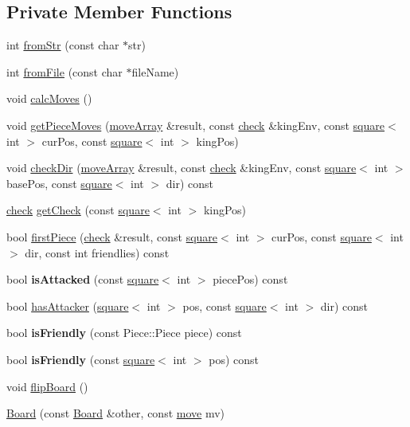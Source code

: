 \subsection*{Private Member Functions}
\begin{DoxyCompactItemize}
\item 
int \hyperlink{classBoard_a49045c77d568e4b5a00f176a2add54c8}{from\+Str} (const char $\ast$str)
\item 
int \hyperlink{classBoard_a4043087fc35e9706d0e83ec07225fe33}{from\+File} (const char $\ast$file\+Name)
\item 
void \hyperlink{classBoard_ad4d3ebb2342b74d9455a89924a54aa14}{calc\+Moves} ()
\item 
void \hyperlink{classBoard_aa70526dde51ab18ec4011c07a7e38e60}{get\+Piece\+Moves} (\hyperlink{structmoveArray}{move\+Array} \&result, const \hyperlink{structcheck}{check} \&king\+Env, const \hyperlink{structsquare}{square}$<$ int $>$ cur\+Pos, const \hyperlink{structsquare}{square}$<$ int $>$ king\+Pos)
\item 
void \hyperlink{classBoard_ab63f400e8fdd7d1747c18642b59cc435}{check\+Dir} (\hyperlink{structmoveArray}{move\+Array} \&result, const \hyperlink{structcheck}{check} \&king\+Env, const \hyperlink{structsquare}{square}$<$ int $>$ base\+Pos, const \hyperlink{structsquare}{square}$<$ int $>$ dir) const
\item 
\hyperlink{structcheck}{check} \hyperlink{classBoard_afc291baf2c205a64255e8e55ffeff004}{get\+Check} (const \hyperlink{structsquare}{square}$<$ int $>$ king\+Pos)
\item 
bool \hyperlink{classBoard_a900420865c9acc6a18a9e25f94e3b72e}{first\+Piece} (\hyperlink{structcheck}{check} \&result, const \hyperlink{structsquare}{square}$<$ int $>$ cur\+Pos, const \hyperlink{structsquare}{square}$<$ int $>$ dir, const int friendlies) const
\item 
\mbox{\label{classBoard_ae8183cabc093c8bd030250c42959fa37}} 
bool {\bfseries is\+Attacked} (const \hyperlink{structsquare}{square}$<$ int $>$ piece\+Pos) const
\item 
bool \hyperlink{classBoard_a8b9245cb469f2e82c23ac49edd412646}{has\+Attacker} (\hyperlink{structsquare}{square}$<$ int $>$ pos, const \hyperlink{structsquare}{square}$<$ int $>$ dir) const
\item 
\mbox{\label{classBoard_a5068575e721428ee78754984813713e5}} 
bool {\bfseries is\+Friendly} (const Piece\+::\+Piece piece) const
\item 
\mbox{\label{classBoard_a33b5e15eeeba65612ad3005ff5e60690}} 
bool {\bfseries is\+Friendly} (const \hyperlink{structsquare}{square}$<$ int $>$ pos) const
\item 
void \hyperlink{classBoard_aeea5a9ddcdeb6e4c087f53e71f6c11ec}{flip\+Board} ()
\item 
\hyperlink{classBoard_a632d2e0f09a1ad6fe835dc11ef1238cc}{Board} (const \hyperlink{classBoard}{Board} \&other, const \hyperlink{structmove}{move} mv)
\end{DoxyCompactItemize}
